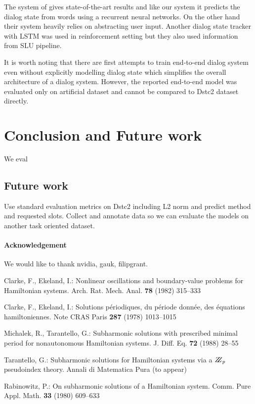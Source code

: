 \documentclass{itatnew}
\begin{document}
The system of \cite{Word-based dialog state tracking with recurrent neural networks-Henderson} gives state-of-the-art results and like our system it predicts the dialog state from words using a recurrent neural networks.
On the other hand their system heavily relies on abstracting user input.
Another dialog state tracker with LSTM was used in reinforcement setting but they also used information from SLU pipeline.\cite{Dialog History Construction with Long-Short Term Memory for Robust Generative Dialog State Tracking}

It is worth noting that there are first attempts to train end-to-end dialog system even without explicitly modelling dialog state\cite{Weston} which simplifies the overall architecture of a dialog system.
However, the reported end-to-end model was evaluated only on artificial dataset and cannot be compared to Dstc2 dataset directly.

\section{Conclusion and Future work}
We eval


\subsection*{Future work}
Use standard evaluation metrics on Dstc2 including L2 norm and predict method and requested slots.
Collect and annotate data so we can evaluate the models on another task oriented dataset.




\paragraph{Acknowledgement}
We would like to thank nvidia, gauk, filipgrant.




%
%
\begin{thebibliography}{5}
%
Clarke, F., Ekeland, I.:
Nonlinear oscillations and
boundary-value problems for Hamiltonian systems.
Arch. Rat. Mech. Anal. {\bf 78} (1982) 315--333

Clarke, F., Ekeland, I.:
Solutions p\'{e}riodiques, du
p\'{e}riode donn\'{e}e, des \'{e}quations hamiltoniennes.
Note CRAS Paris {\bf 287} (1978) 1013--1015

Michalek, R., Tarantello, G.:
Subharmonic solutions with prescribed minimal
period for nonautonomous Hamiltonian systems.
J. Diff. Eq. {\bf 72} (1988) 28--55

Tarantello, G.:
Subharmonic solutions for Hamiltonian
systems via a $\bbbz_{p}$ pseudoindex theory.
Annali di Matematica Pura (to appear)

Rabinowitz, P.:
On subharmonic solutions of a Hamiltonian system.
Comm. Pure Appl. Math. {\bf 33} (1980) 609--633


\end{thebibliography}
\end{document}
